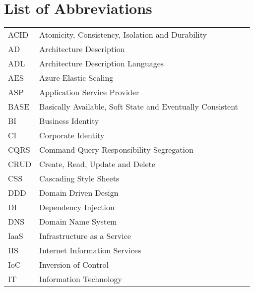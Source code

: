 \chapter{List of Abbreviations}



\begin{table}[h]
\centering
\begin{tabularx}{\textwidth}{l X l}
ACID        & Atomicity, Consistency, Isolation and Durability  &  \\
AD          & Architecture Description &  \\
ADL         & Architecture Description Languages &  \\
AES         & Azure Elastic Scaling                  &  \\
ASP         & Application Service Provider &  \\
BASE        & Basically Available, Soft State and Eventually Consistent & \\
BI          & Business Identity                                                                                     &  \\
CI          & Corporate Identity                                                                                    &  \\
CQRS        & Command Query Responsibility Segregation   &  \\
CRUD        & Create, Read, Update and Delete           &  \\
CSS         & Cascading Style Sheets                                                                                &  \\
DDD         & Domain Driven Design                                                                                  &  \\
DI          & Dependency Injection                                                                                  &  \\
DNS         & Domain Name System                                                                                    &  \\
IaaS        & Infrastructure as a Service   &  \\
IIS         & Internet Information Services &  \\
IoC         & Inversion of Control                                                                                  &  \\
IT          & Information Technology                                                                                &  \\

\end{tabularx}
\end{table}
